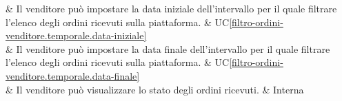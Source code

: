  & Il venditore può impostare la data iniziale dell'intervallo per il quale filtrare l'elenco degli ordini ricevuti sulla piattaforma. & UC\ref{filtro-ordini-venditore.temporale.data-iniziale} \\
    
 & Il venditore può impostare la data finale dell'intervallo per il quale filtrare l'elenco degli ordini ricevuti sulla piattaforma. & UC\ref{filtro-ordini-venditore.temporale.data-finale} \\

 & Il venditore può visualizzare lo stato degli ordini ricevuti. & Interna \\ 
